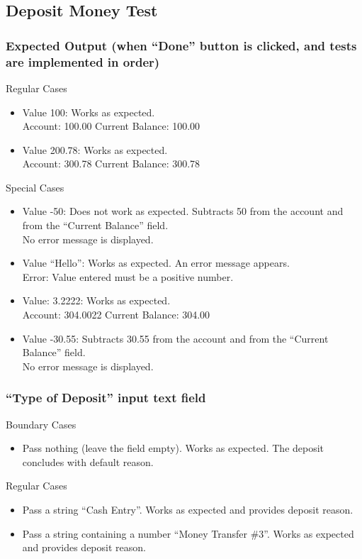\documentclass[12pt]{article}
\begin{document}
\subsection{Deposit Money Test}

\subsubsection{Expected Output (when “Done” button is clicked, and tests are implemented in order)}

Regular Cases
\begin{itemize}
  \item Value 100: Works as expected.\\
Account: 100.00 Current Balance: 100.00
  \item Value 200.78: Works as expected.\\
Account: 300.78 Current Balance: 300.78
\end{itemize}

Special Cases
\begin{itemize}
  \item Value -50: Does not work as expected. Subtracts 50 from the account and from the “Current Balance” field.\\
No error message is displayed.
  \item Value “Hello”: Works as expected. An error message appears.\\
Error: Value entered must be a positive number.
  \item Value: 3.2222: Works as expected.\\
Account: 304.0022 Current Balance: 304.00
  \item Value -30.55: Subtracts 30.55 from the account and from the “Current Balance” field.\\
No error message is displayed.
\end{itemize}

\subsubsection{“Type of Deposit” input text field}

Boundary Cases
\begin{itemize}
  \item Pass nothing (leave the field empty). Works as expected. The deposit concludes with default reason.
\end{itemize}

Regular Cases
\begin{itemize}
  \item Pass a string  “Cash Entry”. Works as expected and provides deposit reason.
  \item Pass a string containing a number  “Money Transfer \#3”. Works as expected and provides deposit reason.
\end{itemize}
\end{document}
